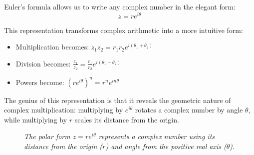 \noindent Euler's formula allows us to write any complex number in the elegant form:
\[
z = re^{i\theta}
\]

\noindent This representation transforms complex arithmetic into a more intuitive form:
\begin{itemize}
   \item Multiplication becomes: $z_1z_2 = r_1r_2e^{i(\theta_1 + \theta_2)}$
   \item Division becomes: $\frac{z_1}{z_2} = \frac{r_1}{r_2}e^{i(\theta_1 - \theta_2)}$
   \item Powers become: $(re^{i\theta})^n = r^ne^{in\theta}$
\end{itemize}

\noindent The genius of this representation is that it reveals the geometric nature of complex multiplication: multiplying by $e^{i\theta}$ rotates a complex number by angle $\theta$, while multiplying by $r$ scales its distance from the origin.

\begin{figure}[H]
\centering
{}
\caption{\textit{The polar form $z = re^{i\theta}$ represents a complex number using its distance from the origin ($r$) and angle from the positive real axis ($\theta$).}}
\label{fig:polar-form}
\end{figure}

